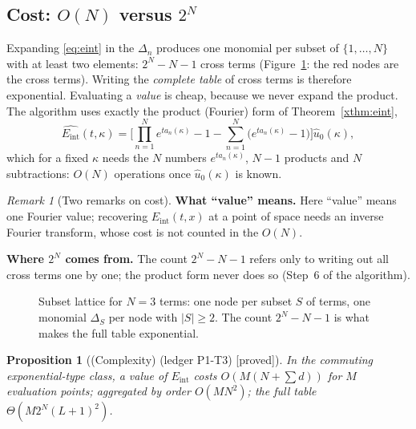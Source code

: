 \documentclass[11pt]{article}
\theoremstyle{plain}
\newtheorem{proposition}[theorem]{Proposition}
\theoremstyle{definition}
\theoremstyle{remark}
\newtheorem{remark}[theorem]{Remark}
\newcommand{\Eint}{E_{\mathrm{int}}}        %
\newcommand{\badge}[2]{\textcolor{#1}{\textsf{\footnotesize[#2]}}}
\newcommand{\proved}[1][]{\badge{cC}{proved#1}}
\newcommand{\led}[1]{\textcolor{cG}{\textsf{\footnotesize(ledger #1)}}}
\newcommand{\edmark}[1]{}
\newenvironment{aside}[1]{\begin{remark}[#1]}{\end{remark}}
\begin{document}
\subsection{Cost: $O(N)$ versus $2^N$}
Expanding \eqref{eq:eint} in the $\Delta_n$ produces one monomial per subset of $\{1,\dots,N\}$ with at least two elements: $2^N-N-1$ cross terms (Figure~\ref{fig:lattice}: the red nodes are the cross terms). Writing the \emph{complete table} of cross terms is therefore exponential. Evaluating a \emph{value} is cheap, because we never expand the product. The algorithm uses exactly the product (Fourier) form of Theorem~\ref{xthm:eint},
\[
\widehat{\Eint}(t,\kappa)=\Big[\prod_{n=1}^Ne^{ta_n(\kappa)}-1-\sum_{n=1}^N\big(e^{ta_n(\kappa)}-1\big)\Big]\hat u_0(\kappa),
\]
which for a fixed $\kappa$ needs the $N$ numbers $e^{ta_n(\kappa)}$, $N-1$ products and $N$ subtractions: $O(N)$ operations once $\hat u_0(\kappa)$ is known.
\begin{aside}{Two remarks on cost}
\textbf{What ``value'' means.} Here ``value'' means one Fourier value; recovering $\Eint(t,x)$ at a point of space needs an inverse Fourier transform, whose cost is not counted in the $O(N)$.

\textbf{Where $2^N$ comes from.} The count $2^N-N-1$ refers only to writing out all cross terms one by one; the product form never does so (Step~6 of the algorithm).
\end{aside}
\begin{figure}[!htb]
\centering
{}
\caption{Subset lattice for $N=3$ terms: one node per subset $S$ of terms, one monomial $\Delta_S$ per node with $|S|\ge2$. The count $2^N-N-1$ is what makes the full table exponential.}\label{fig:lattice}
\end{figure}
\begin{proposition}[{(Complexity) \led{P1-T3} \proved[]}]
In the commuting exponential-type class, a value of $\Eint$ costs $O(M(N+\sum d))$ for $M$ evaluation points; aggregated by order $O(MN^2)$; the full table $\Theta(M2^N(L+1)^2)$.
\end{proposition}
\edmark{E1}
\end{document}
